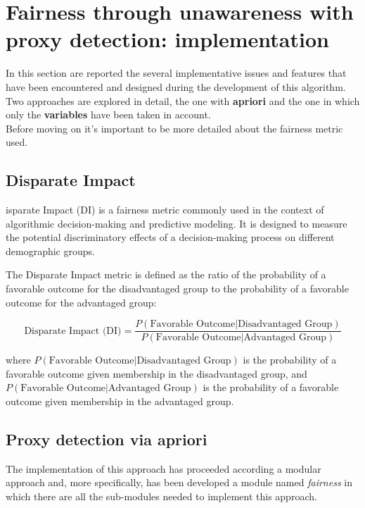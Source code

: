 \documentclass[12pt,a4paper,openright,twoside]{book}
\begin{document}
%

%
%

\section{Fairness through unawareness with proxy detection: implementation}
In this section are reported the several implementative issues and features that have been encountered and designed during the development of this algorithm. Two approaches are explored in detail, the one with \textbf{apriori} and the one in which only the \textbf{variables} have been taken in account. \\
Before moving on it's important to be more detailed about the fairness metric used.
\subsection{Disparate Impact}
isparate Impact (DI) is a fairness metric commonly used in the context of algorithmic decision-making and predictive modeling. It is designed to measure the potential discriminatory effects of a decision-making process on different demographic groups.

The Disparate Impact metric is defined as the ratio of the probability of a favorable outcome for the disadvantaged group to the probability of a favorable outcome for the advantaged group:

\[
\text{Disparate Impact (DI)} = \frac{P(\text{Favorable Outcome} | \text{Disadvantaged Group})}{P(\text{Favorable Outcome} | \text{Advantaged Group})}
\]

where $P(\text{Favorable Outcome} | \text{Disadvantaged Group})$ is the probability of a favorable outcome given membership in the disadvantaged group, and  \\ $P(\text{Favorable Outcome} | \text{Advantaged Group})$ is the probability of a favorable outcome given membership in the advantaged group.
\subsection{Proxy detection via apriori}
The implementation of this approach has proceeded according a modular approach and, more specifically, has been developed a module named \emph{fairness} in which there are all the sub-modules needed to implement this approach.
\end{document}
